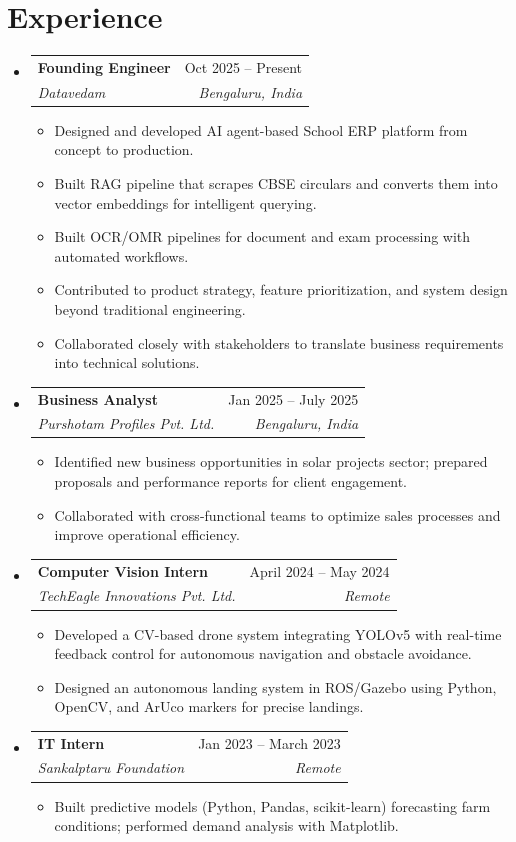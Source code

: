 \documentclass[letterpaper,10pt]{article}
\makeatletter
\newcommand{\resumeItem}[1]{
  \item\small{
    {#1 \vspace{-1pt}}
  }
}
\newcommand{\resumeSubheading}[4]{
  \vspace{-1pt}\item
    \begin{tabular*}{0.97\textwidth}[t]{l@{\extracolsep{\fill}}r}
      \textbf{#1} & #2 \\
      \textit{\small #3} & \textit{\small #4} \\
    \end{tabular*}\vspace{-5pt}
}
\newcommand{\resumeSubHeadingListStart}{\begin{itemize}[leftmargin=0.15in, label={}]}
\newcommand{\resumeSubHeadingListEnd}{\end{itemize}\vspace{-5pt}}
\newcommand{\resumeItemListStart}{\begin{itemize}\vspace{-3pt}}
\newcommand{\resumeItemListEnd}{\end{itemize}\vspace{-2pt}}
\makeatother
\begin{document}
\section{Experience}
\resumeSubHeadingListStart
    \resumeSubheading
      {Founding Engineer}{Oct 2025 -- Present}
      {Datavedam}{Bengaluru, India}
      \resumeItemListStart
        \resumeItem{Designed and developed AI agent-based School ERP platform from concept to production.}
        \resumeItem{Built RAG pipeline that scrapes CBSE circulars and converts them into vector embeddings for intelligent querying.}
        \resumeItem{Built OCR/OMR pipelines for document and exam processing with automated workflows.}
        \resumeItem{Contributed to product strategy, feature prioritization, and system design beyond traditional engineering.}
        \resumeItem{Collaborated closely with stakeholders to translate business requirements into technical solutions.}
      \resumeItemListEnd
    \resumeSubheading
      {Business Analyst}{Jan 2025 -- July 2025}
      {Purshotam Profiles Pvt. Ltd.}{Bengaluru, India}
      \resumeItemListStart
        \resumeItem{Identified new business opportunities in solar projects sector; prepared proposals and performance reports for client engagement.}
        \resumeItem{Collaborated with cross-functional teams to optimize sales processes and improve operational efficiency.}
      \resumeItemListEnd
    \resumeSubheading
      {Computer Vision Intern}{April 2024 -- May 2024}
      {TechEagle Innovations Pvt. Ltd.}{Remote}
      \resumeItemListStart
        \resumeItem{Developed a CV-based drone system integrating YOLOv5 with real-time feedback control for autonomous navigation and obstacle avoidance.}
        \resumeItem{Designed an autonomous landing system in ROS/Gazebo using Python, OpenCV, and ArUco markers for precise landings.}
      \resumeItemListEnd
    \resumeSubheading
      {IT Intern}{Jan 2023 -- March 2023}
      {Sankalptaru Foundation}{Remote}
      \resumeItemListStart
        \resumeItem{Built predictive models (Python, Pandas, scikit-learn) forecasting farm conditions; performed demand analysis with Matplotlib.}
      \resumeItemListEnd
\resumeSubHeadingListEnd
\end{document}

